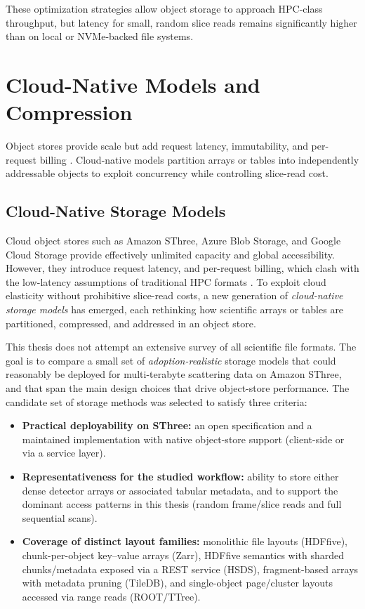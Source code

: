 \documentclass[nomenclature, english, bibtex]{kththesis}
\numberwithin{listing}{chapter}
\begin{document}
These optimization strategies allow object storage to approach \gls{HPC}-class throughput, but latency for small, random slice reads remains significantly higher than on local or \gls{NVMe}-backed file systems.

\section{Cloud-Native Models and Compression}
\label{sec:cloud-native-models-compression}
Object stores provide scale but add request latency, immutability, and per-request billing \cite{durbin2020cloud}. Cloud-native models partition arrays or tables into independently addressable objects to exploit concurrency while controlling slice-read cost.

\subsection{Cloud-Native Storage Models}
\label{sec:cloud-native-storage-models}
Cloud object stores such as Amazon \gls{SThree}, Azure Blob Storage, and Google Cloud Storage provide effectively unlimited capacity and global accessibility. However, they introduce request latency, and per-request billing, which clash with the low-latency assumptions of traditional \gls{HPC} formats \cite{durbin2020cloud}. To exploit cloud elasticity without prohibitive slice-read costs, a new generation of \emph{cloud-native storage models} has emerged, each rethinking how scientific arrays or tables are partitioned, compressed, and addressed in an object store.

This thesis does not attempt an extensive survey of all scientific file formats. The goal is to compare a small set of \emph{adoption-realistic} storage models that could reasonably be deployed for multi-terabyte scattering data on Amazon \gls{SThree}, and that span the main design choices that drive object-store performance. The candidate set of storage methods was selected to satisfy three criteria:

\begin{itemize}
  \item \textbf{Practical deployability on \gls{SThree}:} an open specification and a maintained implementation with native object-store support (client-side or via a service layer).
  \item \textbf{Representativeness for the studied workflow:} ability to store either dense detector arrays or associated tabular metadata, and to support the dominant access patterns in this thesis (random frame/slice reads and full sequential scans).
  \item \textbf{Coverage of distinct layout families:} monolithic file layouts (\gls{HDFfive}), chunk-per-object key–value arrays (Zarr), \gls{HDFfive} semantics with sharded chunks/metadata exposed via a REST service (\gls{HSDS}), fragment-based arrays with metadata pruning (TileDB), and single-object page/cluster layouts accessed via range reads (\gls{ROOT}/\gls{TTree}).
\end{itemize}
\end{document}
